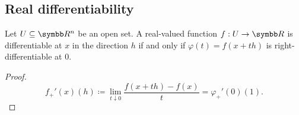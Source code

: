 \subsection{Real differentiability}\label{subsec:real_differentiability}

\begin{proposition}\label{thm:real_valued_differentiability}
  Let \( U \subseteq \BR^n \) be an open set. A real-valued function \( f: U \to \BR \) is differentiable at \( x \) in the direction \( h \) if and only if \( \varphi(t) = f(x + th) \) is right-differentiable at \( 0 \).
\end{proposition}
\begin{proof}
  \begin{equation*}
    f_+'(x)(h) \coloneqq \lim_{t \downarrow 0} \frac {f(x + th) - f(x)} t = \varphi_+'(0)(1).
  \end{equation*}
\end{proof}

